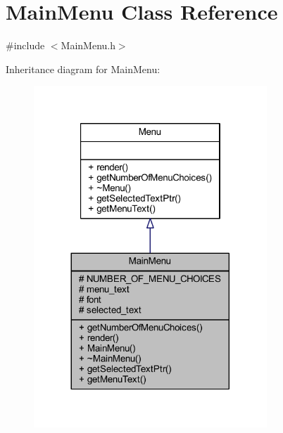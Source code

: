 \hypertarget{class_main_menu}{}\section{Main\+Menu Class Reference}
\label{class_main_menu}


{\ttfamily \#include $<$Main\+Menu.\+h$>$}



Inheritance diagram for Main\+Menu\+:
\nopagebreak
\begin{figure}[H]
\begin{center}
\leavevmode
\includegraphics[width=248pt]{class_main_menu__inherit__graph}
\end{center}
\end{figure}


